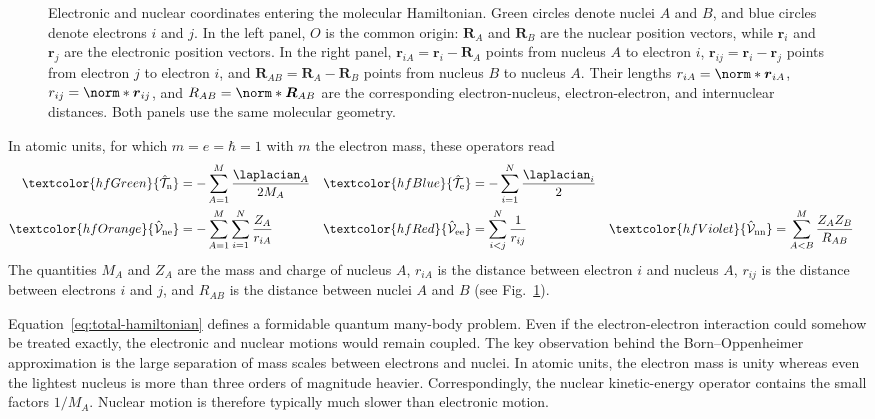 \documentclass[11pt,a4paper,titlepage]{article}
\numberwithin{equation}{section}
\newcommand{\br}{\boldsymbol{r}}
\newcommand{\bR}{\boldsymbol{R}}
\newcommand{\chT}{\Hat{\mathcal{T}}}
\newcommand{\chV}{\Hat{\mathcal{V}}}
\newcommand{\red}[1]{\textcolor{hfRed}{#1}}
\newcommand{\orange}[1]{\textcolor{hfOrange}{#1}}
\newcommand{\green}[1]{\textcolor{hfGreen}{#1}}
\newcommand{\blue}[1]{\textcolor{hfBlue}{#1}}
\newcommand{\violet}[1]{\textcolor{hfViolet}{#1}}
\begin{document}
\begin{figure}[htbp]
{%
}
  \caption{Electronic and nuclear coordinates entering the molecular
  Hamiltonian. Green circles denote nuclei $A$ and $B$, and blue circles
  denote electrons $i$ and $j$. In the left panel, $O$ is the common origin:
  $\bR_A$ and $\bR_B$ are the nuclear position vectors, while $\br_i$ and
  $\br_j$ are the electronic position vectors. In the right panel,
  $\br_{iA}=\br_i-\bR_A$ points from nucleus $A$ to electron $i$,
  $\br_{ij}=\br_i-\br_j$ points from electron $j$ to electron $i$, and
  $\bR_{AB}=\bR_A-\bR_B$ points from nucleus $B$ to nucleus $A$.
  Their lengths $r_{iA}=\norm*{\br_{iA}}$, $r_{ij}=\norm*{\br_{ij}}$, and
  $R_{AB}=\norm*{\bR_{AB}}$ are the corresponding electron-nucleus,
  electron-electron, and internuclear distances. Both panels use the same
  molecular geometry.}
  \label{fig:molecular-coordinates}
\end{figure}

In atomic units, for which $m=e=\hbar=1$ with $m$ the electron mass,
these operators read
\begin{subequations}
\begin{align}
  \green{\chT_\text{n}}
  &=
  -\sum_{A=1}^{M}
  \frac{\laplacian_A}{2M_A}
  &
  \blue{\chT_\text{e}}
  &=
  -\sum_{i=1}^{N}
  \frac{\laplacian_i}{2}
  \\
  \orange{\chV_\text{ne}}
  &=
  -\sum_{A=1}^{M}
  \sum_{i=1}^{N}
  \frac{Z_A}{r_{iA}}
  &
  \red{\chV_\text{ee}}
  &=
  \sum_{i<j}^{N}
  \frac{1}{r_{ij}}
  &
  \violet{\chV_\text{nn}}
  &=
  \sum_{A<B}^{M}
  \frac{Z_A Z_B}{R_{AB}}
\end{align}
\end{subequations}
The quantities $M_A$ and $Z_A$ are the mass and charge of nucleus $A$,
$r_{iA}$ is the distance between electron $i$ and nucleus $A$, $r_{ij}$ is
the distance between electrons $i$ and $j$, and $R_{AB}$ is the distance
between nuclei $A$ and $B$ (see Fig.~\ref{fig:molecular-coordinates}).

Equation~\eqref{eq:total-hamiltonian} defines a formidable quantum
many-body problem. Even if the electron-electron interaction could somehow
be treated exactly, the electronic and nuclear motions would remain coupled.
The key observation behind the Born--Oppenheimer approximation is the large
separation of mass scales between electrons and nuclei. In atomic units, the
electron mass is unity whereas even the lightest nucleus is more than three
orders of magnitude heavier. Correspondingly, the nuclear kinetic-energy
operator contains the small factors $1/M_A$. Nuclear motion is therefore
typically much slower than electronic motion.
\end{document}

